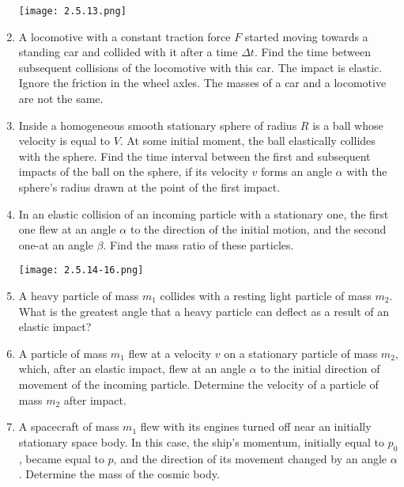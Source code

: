 \documentclass{article}
\begin{document}
\begin{enumerate}[label=2.5.\arabic*]
\begin{center}
    \texttt{[image: 2.5.13.png]}
\end{center}

\item A locomotive with a constant traction force $F$ started moving towards a standing car and collided with it after a time $\Delta t$. Find the time between subsequent collisions of the locomotive with this car. The impact is elastic. Ignore the friction in the wheel axles. The masses of a car and a locomotive are not the same.

\item Inside a homogeneous smooth stationary sphere of radius $R$ is a ball whose velocity is equal to $V$. At some initial moment, the ball elastically collides with the sphere. Find the time interval between the first and subsequent impacts of the ball on the sphere, if its velocity $v$ forms an angle $\alpha$ with the sphere's radius drawn at the point of the first impact.

\item In an elastic collision of an incoming particle with a stationary one, the first one flew at an angle $\alpha$ to the direction of the initial motion, and the second one-at an angle $\beta$. Find the mass ratio of these particles.

\begin{center}
    \texttt{[image: 2.5.14-16.png]}
\end{center}

\item A heavy particle of mass $m_1$ collides with a resting light particle of mass $m_2$. What is the greatest angle that a heavy particle can deflect as a result of an elastic impact?

\item A particle of mass $m_1$ flew at a velocity $v$ on a stationary particle of mass $m_2$, which, after an elastic impact, flew at an angle $\alpha$ to the initial direction of movement of the incoming particle. Determine the velocity of a particle of mass $m_2$ after impact.

\item A spacecraft of mass $m_1$ flew with its engines turned off near an initially stationary space body. In this case, the ship's momentum, initially equal to $p_0$, became equal to $p$, and the direction of its movement changed by an angle $\alpha$. Determine the mass of the cosmic body.


\end{enumerate}
\end{document}
